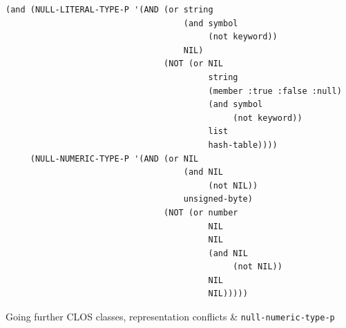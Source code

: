\documentclass[aspectratio=169]{beamer}
\renewcommand\code[1]{\texttt{#1}}
\begin{document}
\begin{frame}[fragile]
  \begin{popup}{.7}
    \vspace*{-2em}
    \begin{mintedcodebox}
\begin{verbatim}
(and (NULL-LITERAL-TYPE-P '(AND (or string
                                    (and symbol
                                         (not keyword))
                                    NIL)
                                (NOT (or NIL
                                         string
                                         (member :true :false :null)
                                         (and symbol
                                              (not keyword))
                                         list
                                         hash-table))))
     (NULL-NUMERIC-TYPE-P '(AND (or NIL
                                    (and NIL
                                         (not NIL))
                                    unsigned-byte)
                                (NOT (or number
                                         NIL
                                         NIL
                                         (and NIL
                                              (not NIL))
                                         NIL
                                         NIL)))))
\end{verbatim}
    \end{mintedcodebox}
  \end{popup}
\end{frame}

\begin{sectionframe}{Going further}
  CLOS classes, representation conflicts \& \code{null-numeric-type-p}
\end{sectionframe}
\end{document}
